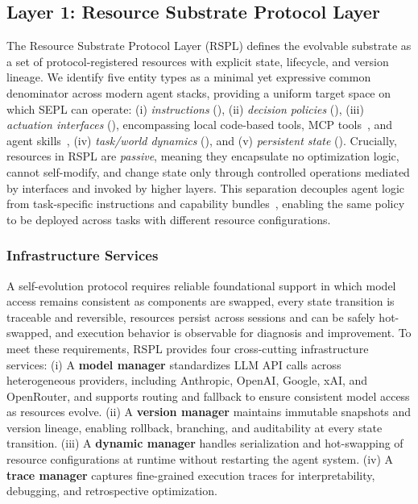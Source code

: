 \documentclass{article}
\theoremstyle{plain}
\theoremstyle{definition}
\theoremstyle{remark}
\begin{document}
\vspace{-0.2cm}
\subsection{Layer 1: Resource Substrate Protocol Layer}
\vspace{-0.2cm}

The Resource Substrate Protocol Layer (RSPL) defines the evolvable substrate as a set of protocol-registered resources with explicit state, lifecycle, and version lineage. We identify five entity types as a minimal yet expressive common denominator across modern agent stacks, providing a uniform target space on which SEPL can operate: (i) \emph{instructions} (), (ii) \emph{decision policies} (), (iii) \emph{actuation interfaces} (), encompassing local code-based tools, MCP tools~\cite{anthropic2025}, and agent skills~\cite{anthropic2025agentskills}, (iv) \emph{task/world dynamics} (), and (v) \emph{persistent state} (). Crucially, resources in RSPL are \emph{passive}, meaning they encapsulate no optimization logic, cannot self-modify, and change state only through controlled operations mediated by interfaces and invoked by higher layers. This separation decouples agent logic from task-specific instructions and capability bundles~\cite{wu2024autogen, hong2023metagpt, chen2023agentverse}, enabling the same policy to be deployed across tasks with different resource configurations.

\vspace{-0.2cm}
\subsubsection{Infrastructure Services}
\vspace{-0.2cm}

A self-evolution protocol requires reliable foundational support in which model access remains consistent as components are swapped, every state transition is traceable and reversible, resources persist across sessions and can be safely hot-swapped, and execution behavior is observable for diagnosis and improvement. To meet these requirements, RSPL provides four cross-cutting infrastructure services: (i) A \textbf{model manager} standardizes LLM API calls across heterogeneous providers, including Anthropic, OpenAI, Google, xAI, and OpenRouter, and supports routing and fallback to ensure consistent model access as resources evolve. (ii) A \textbf{version manager} maintains immutable snapshots and version lineage, enabling rollback, branching, and auditability at every state transition. (iii) A \textbf{dynamic manager} handles serialization and hot-swapping of resource configurations at runtime without restarting the agent system. (iv) A \textbf{trace manager} captures fine-grained execution traces for interpretability, debugging, and retrospective optimization.
\end{document}
